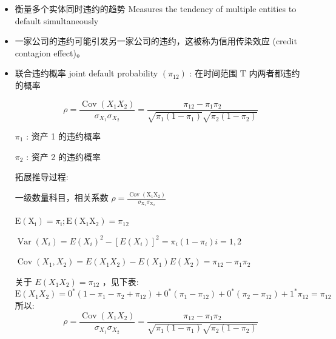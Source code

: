 \begin{itemize}
    \item 衡量多个实体同时违约的趋势 Measures the tendency of multiple entities to default simultaneously
    
    \item 一家公司的违约可能引发另一家公司的违约，这被称为信用传染效应 (credit contagion effect)。
    
    \item 联合违约概率 joint default probability \(\left( {\pi }_{12}\right)\) : 在时间范围 \(\mathrm{T}\) 内两者都违约的概率
    
    \[
    \rho  = \frac{\operatorname{Cov}\left( {{X}_{1}{X}_{2}}\right) }{{\sigma }_{{X}_{1}}{\sigma }_{{X}_{2}}} = \frac{{\pi }_{12} - {\pi }_{1}{\pi }_{2}}{\sqrt{{\pi }_{1}\left( {1 - {\pi }_{1}}\right) }\sqrt{{\pi }_{2}\left( {1 - {\pi }_{2}}\right) }}
    \]
    
     \({\pi }_{1}\) : 资产 1 的违约概率
    
    \({\pi }_{2}\) : 资产 2 的违约概率
    
    拓展推导过程:
    
    一级数量科目，相关系数 \(\rho  = \frac{\operatorname{Cov}\left( {{\mathrm{X}}_{1}{\mathrm{X}}_{2}}\right) }{{\sigma }_{{\mathrm{X}}_{1}}{\sigma }_{{\mathrm{X}}_{2}}}\)
    
    \(\mathrm{E}\left( {\mathrm{X}}_{\mathrm{i}}\right)  = {\pi }_{\mathrm{i}};\mathrm{E}\left( {{\mathrm{X}}_{1}{\mathrm{X}}_{2}}\right)  = {\pi }_{12}\)
    
    \(\operatorname{Var}\left( {X}_{i}\right)  = E{\left( {X}_{i}\right) }^{2} - {\left\lbrack  E\left( {X}_{i}\right) \right\rbrack  }^{2} = {\pi }_{i}\left( {1 - {\pi }_{i}}\right) i = 1,2\)
    
    \(\operatorname{Cov}\left( {{X}_{1},{X}_{2}}\right)  = E\left( {{X}_{1}{X}_{2}}\right)  - E\left( {X}_{1}\right) E\left( {X}_{2}\right)  = {\pi }_{12} - {\pi }_{1}{\pi }_{2}\)
    
    关于 \(E\left( {{X}_{1}{X}_{2}}\right)  = {\pi }_{12}\) ，见下表: \(\mathrm{E}\left( {{X}_{1}{X}_{2}}\right)  = {0}^{ * }\left( {1 - {\pi }_{1} - {\pi }_{2} + {\pi }_{12}}\right)  + {0}^{ * }\left( {{\pi }_{1} - {\pi }_{12}}\right)  + {0}^{ * }\left( {{\pi }_{2} - {\pi }_{12}}\right)  + {1}^{ * }{\pi }_{12} = {\pi }_{12}\) 所以: \[\rho  = \frac{\operatorname{Cov}\left( {{X}_{1}{X}_{2}}\right) }{{\sigma }_{{X}_{1}}{\sigma }_{{X}_{2}}} = \frac{{\pi }_{12} - {\pi }_{1}{\pi }_{2}}{\sqrt{{\pi }_{1}\left( {1 - {\pi }_{1}}\right) }\sqrt{{\pi }_{2}\left( {1 - {\pi }_{2}}\right) }}\]
    

\end{itemize}
